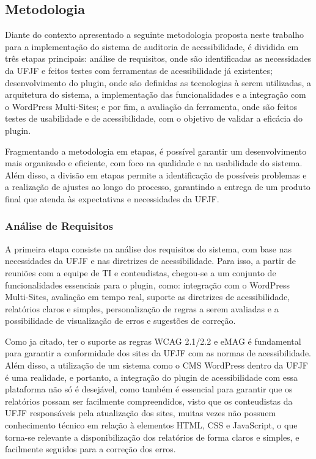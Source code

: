 \documentclass[12pt]{article}
\begin{document}
\subsection{Metodologia}\label{subsec:metodologia}
Diante do contexto apresentado a seguinte metodologia proposta neste trabalho 
para a implementação do sistema de auditoria de acessibilidade, é dividida
em três etapas principais: análise de requisitos, onde são identificadas as
necessidades da UFJF e feitos testes com ferramentas de acessibilidade já
existentes; desenvolvimento do plugin, onde são definidas as tecnologias à serem
utilizadas, a arquitetura do sistema, a implementação das funcionalidades e a
integração com o WordPress Multi-Sites; e por fim, a avaliação da ferramenta,
onde são feitos testes de usabilidade e de acessibilidade, com o objetivo de
validar a eficácia do plugin.

Fragmentando a metodologia em etapas, é possível garantir um desenvolvimento
mais organizado e eficiente, com foco na qualidade e na usabilidade do sistema.
Além disso, a divisão em etapas permite a identificação de possíveis problemas
e a realização de ajustes ao longo do processo, garantindo a entrega de um
produto final que atenda às expectativas e necessidades da UFJF\@.

\subsubsection{Análise de Requisitos}
A primeira etapa consiste na análise dos requisitos do sistema, com base nas
necessidades da UFJF e nas diretrizes de acessibilidade. Para isso, a partir 
de reuniões com a equipe de TI e conteudistas, chegou-se a um conjunto de
funcionalidades essenciais para o plugin, como: integração com o WordPress 
Multi-Sites, avaliação em tempo real, suporte as diretrizes de acessibilidade, 
relatórios claros e simples, personalização de regras a serem avaliadas e a 
possibilidade de visualização de erros e sugestões de correção.

Como ja citado, ter o suporte as regras WCAG 2.1/2.2 e eMAG é fundamental para
garantir a conformidade dos sites da UFJF com as normas de acessibilidade.
Além disso, a utilização de um sistema como o CMS WordPress dentro da UFJF 
é uma realidade, e portanto, a integração do plugin de acessibilidade com 
essa plataforma não só é desejável, como também é essencial para garantir 
que os relatórios possam ser facilmente compreendidos, visto que os 
conteudistas da UFJF responsáveis pela atualização dos sites, muitas
vezes não possuem conhecimento técnico em relação à elementos HTML,
CSS e JavaScript, o que torna-se relevante a disponibilização dos
relatórios de forma claros e simples, e facilmente seguidos para a 
correção dos erros.
\end{document}
